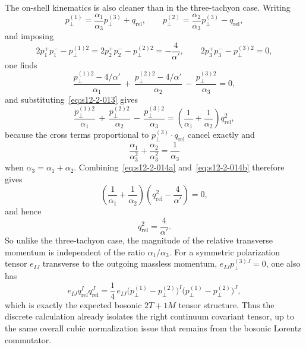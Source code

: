 \documentclass[11pt]{article}
\numberwithin{equation}{section}
\begin{document}
The on-shell kinematics is also cleaner than in the three-tachyon case. Writing
\begin{equation}
\label{eq:s12-2-013}
p_\perp^{(1)}=\frac{\alpha_1}{\alpha_3}p_\perp^{(3)}+q_{\mathrm{rel}},
\qquad
p_\perp^{(2)}=\frac{\alpha_2}{\alpha_3}p_\perp^{(3)}-q_{\mathrm{rel}},
\end{equation}
and imposing
\begin{equation}
\label{eq:s12-2-014}
2p_1^+p_1^- - p_\perp^{(1)2}
=
2p_2^+p_2^- - p_\perp^{(2)2}
=
-\frac{4}{\alpha'},
\qquad
2p_3^+p_3^- - p_\perp^{(3)2}=0,
\end{equation}
one finds
\begin{equation}
\label{eq:s12-2-014a}
\frac{p_\perp^{(1)2}-4/\alpha'}{\alpha_1}
\,+\,
\frac{p_\perp^{(2)2}-4/\alpha'}{\alpha_2}
\,-\,
\frac{p_\perp^{(3)2}}{\alpha_3}
=0,
\end{equation}
and substituting~\eqref{eq:s12-2-013} gives
\begin{equation}
\label{eq:s12-2-014b}
\frac{p_\perp^{(1)2}}{\alpha_1}
\,+\,
\frac{p_\perp^{(2)2}}{\alpha_2}
\,-\,
\frac{p_\perp^{(3)2}}{\alpha_3}
=
\left(\frac{1}{\alpha_1}+\frac{1}{\alpha_2}\right)q_{\mathrm{rel}}^2,
\end{equation}
because the cross terms proportional to $p_\perp^{(3)}\!\cdot q_{\mathrm{rel}}$ cancel exactly and
\begin{equation}
\label{eq:s12-2-014c}
\frac{\alpha_1}{\alpha_3^2}+\frac{\alpha_2}{\alpha_3^2}
=
\frac{1}{\alpha_3}
\end{equation}
when $\alpha_3=\alpha_1+\alpha_2$. Combining~\eqref{eq:s12-2-014a} and~\eqref{eq:s12-2-014b} therefore gives
\begin{equation}
\label{eq:s12-2-014d}
\left(\frac{1}{\alpha_1}+\frac{1}{\alpha_2}\right)
\left(q_{\mathrm{rel}}^2-\frac{4}{\alpha'}\right)=0,
\end{equation}
and hence
\begin{equation}
\label{eq:s12-2-015}
q_{\mathrm{rel}}^2=\frac{4}{\alpha'}.
\end{equation}
So unlike the three-tachyon case, the magnitude of the relative transverse momentum is independent of the ratio $\alpha_1/\alpha_3$. For a symmetric polarization tensor $e_{IJ}$ transverse to the outgoing massless momentum, $e_{IJ}p_\perp^{(3)J}=0$, one also has
\begin{equation}
\label{eq:s12-2-016}
e_{IJ}q_{\mathrm{rel}}^I q_{\mathrm{rel}}^J
=
\frac14\,
e_{IJ}
\bigl(p_\perp^{(1)}-p_\perp^{(2)}\bigr)^I
\bigl(p_\perp^{(1)}-p_\perp^{(2)}\bigr)^J,
\end{equation}
which is exactly the expected bosonic $2T+1M$ tensor structure. Thus the discrete calculation already isolates the right continuum covariant tensor, up to the same overall cubic normalization issue that remains from the bosonic Lorentz commutator.
\end{document}
